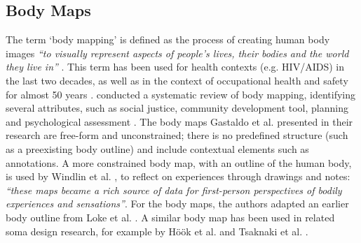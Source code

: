 \subsection*{Body Maps}

The term ‘body mapping’ is defined as the process of creating human body images \textit{``to visually represent aspects of people's lives, their bodies and the world they live in''} \cite{gastaldo_body-map_2012}. This term has been used for health contexts (e.g. HIV/AIDS) in the last two decades, as well as in the context of occupational health and safety for almost 50 years \cite{gastaldo_body-map_2012}. \citeauthor{de_jager_embodied_2016} conducted a systematic review of body mapping, identifying several attributes, such as social justice, community development tool, planning and psychological assessment \cite{de_jager_embodied_2016}. The body maps Gastaldo et al. \cite{gastaldo_body-map_2012} presented in their research are free-form and unconstrained; there is no predefined structure (such as a preexisting body outline) and include contextual elements such as annotations. A more constrained body map, with an outline of the human body, is used by Windlin et al. \cite{windlin_soma_2019}, to reflect on experiences through drawings and notes: \textit{“these maps became a rich source of data for first-person perspectives of bodily experiences and sensations”}. For the body maps, the authors adapted an earlier body outline from Loke et al. \cite{loke_bodily_2012}. A similar body map has been used in related soma design research, for example by Höök et al. \cite{hook_soma_2019} and Tsaknaki et al. \cite{tsaknaki_teaching_2019}.

